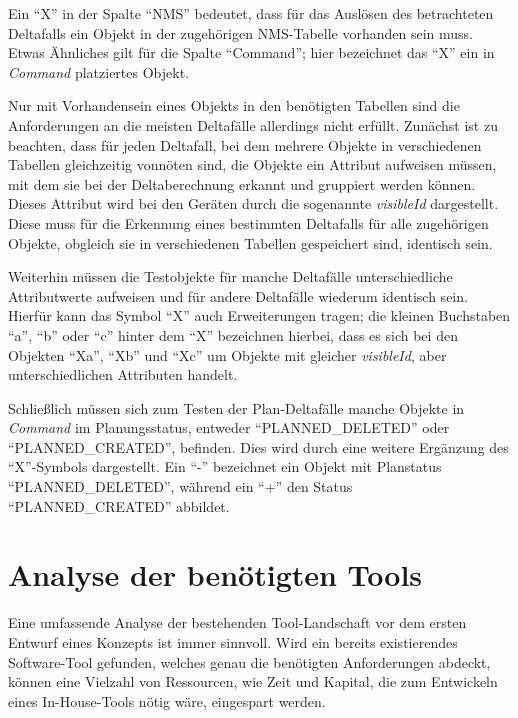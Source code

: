 Ein \enquote{X} in der Spalte \enquote{NMS} bedeutet, dass für das Auslösen des betrachteten Deltafalls ein Objekt in der zugehörigen \ac{NMS}-Tabelle vorhanden sein muss. Etwas Ähnliches gilt für die Spalte \enquote{Command}; hier bezeichnet das \enquote{X} ein in \textit{Command} platziertes Objekt.

Nur mit Vorhandensein eines Objekts in den benötigten Tabellen sind die Anforderungen an die meisten Deltafälle allerdings nicht erfüllt. Zunächst ist zu beachten, dass für jeden Deltafall, bei dem mehrere Objekte in verschiedenen Tabellen gleichzeitig vonnöten sind, die Objekte ein Attribut aufweisen müssen, mit dem sie bei der Deltaberechnung erkannt und gruppiert werden können. Dieses Attribut wird bei den Geräten durch die sogenannte \textit{visibleId} dargestellt. Diese muss für die Erkennung eines bestimmten Deltafalls für alle zugehörigen Objekte, obgleich sie in verschiedenen Tabellen gespeichert sind, identisch sein.

Weiterhin müssen die Testobjekte für manche Deltafälle unterschiedliche Attributwerte aufweisen und für andere Deltafälle wiederum identisch sein. Hierfür kann das Symbol \enquote{X} auch Erweiterungen tragen; die kleinen Buchstaben \enquote{a}, \enquote{b} oder \enquote{c} hinter dem \enquote{X} bezeichnen hierbei, dass es sich bei den Objekten \enquote{Xa}, \enquote{Xb} und \enquote{Xc} um Objekte mit gleicher \textit{visibleId}, aber unterschiedlichen Attributen handelt.

Schließlich müssen sich zum Testen der Plan-Deltafälle manche Objekte in \textit{Command} im Planungsstatus, entweder \enquote{PLANNED\_DELETED} oder \enquote{PLANNED\_CREATED}, befinden. Dies wird durch eine weitere Ergänzung des \enquote{X}-Symbols dargestellt. Ein \enquote{-} bezeichnet ein Objekt mit Planstatus \enquote{PLANNED\_DELETED}, während ein \enquote{+} den Status \enquote{PLANNED\_CREATED} abbildet.

\section{Analyse der benötigten Tools}\label{sec:toolanalyse}
Eine umfassende Analyse der bestehenden Tool-Landschaft vor dem ersten Entwurf eines Konzepts ist immer sinnvoll. Wird ein bereits existierendes Software-Tool gefunden, welches genau die benötigten Anforderungen abdeckt, können eine Vielzahl von Ressourcen, wie Zeit und Kapital, die zum Entwickeln eines In-House-Tools nötig wäre, eingespart werden. 


